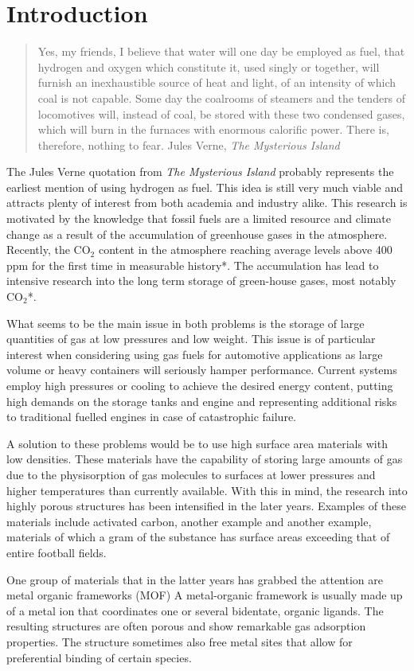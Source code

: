 \chapter{Introduction}
\flushleft

\begin{quotation}
Yes, my friends, I believe that water will one day be employed as fuel,
that hydrogen and oxygen which constitute it, used singly or together, will
furnish an inexhaustible source of heat and light, of an intensity of which
coal is not capable. Some day the coalrooms of steamers and the tenders of
locomotives will, instead of coal, be stored with these two condensed
gases, which will burn in the furnaces with enormous calorific power. There
is, therefore, nothing to fear. 
\raggedleft Jules Verne, \emph{The Mysterious Island}\cite{vernemysterious}
\end{quotation}

The Jules Verne quotation from \emph{The Mysterious Island}  probably  represents the earliest mention of using hydrogen as fuel. This idea is still very much viable and attracts plenty of interest from both academia and industry alike. This research is motivated by the knowledge that fossil fuels are a limited resource and climate change as a result of the accumulation of greenhouse gases in the atmosphere. Recently, the CO$_2$ content in the atmosphere reaching average levels above 400 ppm for the first time in measurable history*. The accumulation has lead to intensive research into the long term storage of green-house gases, most notably CO$_2$*.

What seems to be the main issue in both problems is the storage of large quantities of gas at low pressures and low weight. This issue is of particular interest when considering using gas fuels for automotive applications as large volume or heavy containers will seriously hamper performance. Current systems employ high pressures or cooling to achieve the desired energy content, putting high demands on the storage tanks and engine and representing additional risks to traditional fuelled engines in case of catastrophic failure.

A solution to these problems would be to use high surface area materials with low densities. These materials have the capability of storing large amounts of gas due to the physisorption of gas molecules to surfaces at lower pressures and higher temperatures than currently available. With this in mind, the research into highly porous structures has been intensified in the later years. Examples of these materials include activated carbon, another example and another example, materials of which a gram of the substance has surface areas exceeding that of entire football fields.

One group of materials that in the latter years has grabbed the attention are metal organic frameworks (MOF) %
A metal-organic framework is usually made up of a metal ion that coordinates one or several bidentate, organic ligands. The resulting structures are often porous and show remarkable gas adsorption properties.\supercite{Cheetham99, Lewis09} The structure sometimes also free metal sites that allow for preferential binding of certain species.